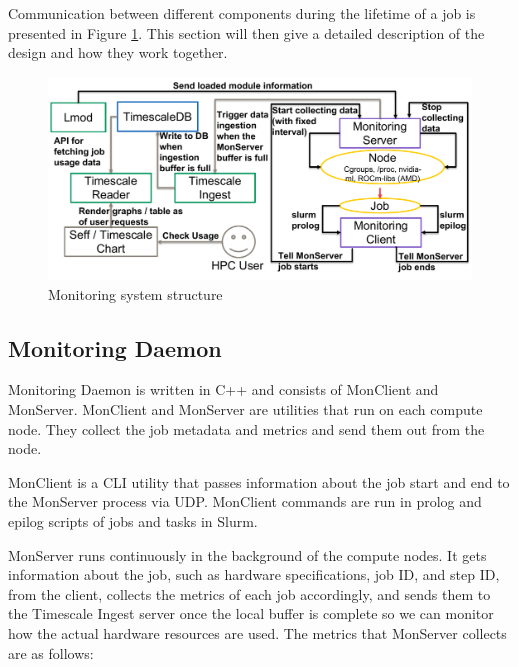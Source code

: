 
Communication between different components during the lifetime of a job is presented in Figure \ref{fig_monitoring}. This section will then give a detailed description of the design and how they work together.

\begin{figure}[H]
    \centering
    \includegraphics[width=1\textwidth]{figures/monitoring.pdf}
    \caption{Monitoring system structure}
    \label{fig_monitoring}
\end{figure}

\subsection{Monitoring Daemon}

Monitoring Daemon is written in C++ and consists of MonClient and MonServer. MonClient and MonServer are utilities that run on each compute node. They collect the job metadata and metrics and send them out from the node.

MonClient is a CLI utility that passes information about the job start and end to the MonServer process via UDP. MonClient commands are run in prolog and epilog scripts of jobs and tasks in Slurm.

MonServer runs continuously in the background of the compute nodes. It gets information about the job, such as hardware specifications, job ID, and step ID, from the client, collects the metrics of each job accordingly, and sends them to the Timescale Ingest server once the local buffer is complete so we can monitor how the actual hardware resources are used. The metrics that MonServer collects are as follows:

